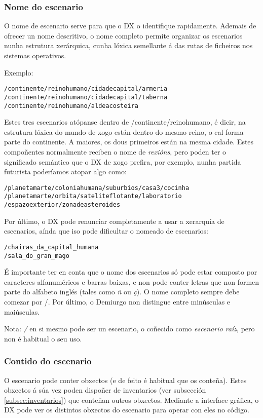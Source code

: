 \subsubsection{Nome do escenario}
\label{subsec:nome-escenarios}
O nome de escenario serve para que o DX o identifique rapidamente. Ademais de
ofrecer un nome descritivo, o nome completo permite organizar os escenarios
nunha estrutura xerárquica, cunha lóxica semellante á das rutas de ficheiros nos
sistemas operativos.
\par
Exemplo:
\begin{lstlisting}
/continente/reinohumano/cidadecapital/armeria
/continente/reinohumano/cidadecapital/taberna
/continente/reinohumano/aldeacosteira
\end{lstlisting}
\par
Estes tres escenarios atópanse dentro de /continente/reinohumano, é dicir,
na estrutura lóxica do mundo de xogo están dentro do mesmo reino, o cal forma
parte do continente. A maiores, os dous primeiros están na mesma cidade. Estes
compoñentes normalmente reciben o nome de {\it rexións}, pero poden ter o
significado semántico que o DX de xogo prefira, por exemplo, nunha partida
futurista poderíamos atopar algo como:
\begin{lstlisting}
/planetamarte/coloniahumana/suburbios/casa3/cocinha
/planetamarte/orbita/sateliteflotante/laboratorio
/espazoexterior/zonadeasteroides
\end{lstlisting}
\par
Por último, o DX pode renunciar completamente a usar a xerarquía de escenarios,
aínda que iso pode dificultar o nomeado de escenarios:
\begin{lstlisting}
/chairas_da_capital_humana
/sala_do_gran_mago
\end{lstlisting}
\par
É importante ter en conta que o nome dos escenarios só pode estar composto por
caracteres alfanuméricos e barras baixas, e non pode conter letras que non
formen parte do alfabeto inglés (tales como {\it ñ} ou {\it ç}). O nome completo
sempre debe comezar por /. Por último, o Demiurgo non distingue entre
minúsculas e maiúsculas.
\par
Nota: {\it /} en si mesmo pode ser un escenario, o coñecido como {\it escenario
raíz}, pero non é habitual o seu uso.

\subsubsection{Contido do escenario}
O escenario pode conter obxectos (e de feito é habitual que os conteña). Estes
obxectos á súa vez poden dispoñer de inventarios (ver
subsección \ref{subsec:inventarios}) que conteñan outros obxectos. Mediante a
interface gráfica, o DX pode ver os distintos obxectos do escenario para operar
con eles no código.

